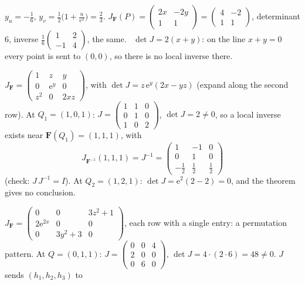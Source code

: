 \begin{solutions}
        $y_{u}=-\tfrac16$, $y_{v}=\tfrac12\bigl(1+\tfrac{u}{v^{2}}\bigr)
        =\tfrac23$. $J_{\mathbf{F}}(P)=\begin{pmatrix}2x&-2y\\1&1\end{pmatrix}
        =\begin{pmatrix}4&-2\\1&1\end{pmatrix}$, determinant $6$, inverse
        $\tfrac16\begin{pmatrix}1&2\\-1&4\end{pmatrix}$, the same.
        \checkmark\ $\det J=2(x+y)$: on the line $x+y=0$ every point is
        sent to $(0,0)$, so there is no local inverse there.
  \item $J_{\mathbf{F}}=\begin{pmatrix}1&z&y\\0&\mathrm{e}^{y}&0\\z^{2}&0&2xz
        \end{pmatrix}$, with $\det J=z\,\mathrm{e}^{y}(2x-yz)$ (expand along
        the second row).
        At $Q_{1}=(1,0,1)$: $J=\begin{pmatrix}1&1&0\\0&1&0\\1&0&2
        \end{pmatrix}$, $\det J=2\neq0$, so a local inverse exists near
        $\mathbf{F}(Q_{1})=(1,1,1)$, with
        \[
          J_{\mathbf{F}^{-1}}(1,1,1)=J^{-1}=\begin{pmatrix}1&-1&0\\0&1&0\\
          -\tfrac12&\tfrac12&\tfrac12\end{pmatrix}
        \]
        (check: $J\,J^{-1}=I$). At $Q_{2}=(1,2,1)$: $\det J=\mathrm{e}^{2}
        (2-2)=0$, and the theorem gives no conclusion.
  \item $J_{\mathbf{F}}=\begin{pmatrix}0&0&3z^{2}+1\\2\mathrm{e}^{2x}&0&0\\
        0&3y^{2}+3&0\end{pmatrix}$, each row with a single entry: a
        permutation pattern. At $Q=(0,1,1)$:
        $J=\begin{pmatrix}0&0&4\\2&0&0\\0&6&0\end{pmatrix}$,
        $\det J=4\cdot(2\cdot6)=48\neq0$. $J$ sends $(h_{1},h_{2},h_{3})$ to

\end{solutions}
